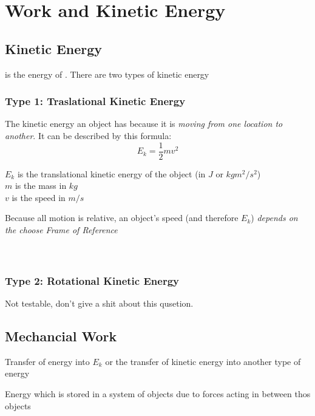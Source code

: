 \section{Work and Kinetic Energy}
\subsection{Kinetic Energy}
\begin{cyanblock}
    \begin{definition}
         is the energy of . There are two types of kinetic energy
    \end{definition}
\end{cyanblock}

\subsubsection*{Type 1: Traslational Kinetic Energy}
The kinetic energy an object has because it is \textit{moving from one location to another}. It can be described by this 
formula:
\begin{equation}
    E_k = \frac{1}{2}mv^2
\end{equation}
\begin{center}
    $E_k$ is the translational kinetic energy of the object (in $J$ or $kgm^2/s^2$)\\
    $m$ is the mass in $kg$\\
    $v$ is the speed in $m/s$
\end{center}

Because all motion is relative, an object's speed (and therefore $E_k$) \textit{depends on the choose Frame of Reference}\\

\\

\\


\subsubsection*{Type 2: Rotational Kinetic Energy}
    Not testable, don't give a shit about this qusetion. 

\subsection{Mechancial Work}
\begin{cyanblock}
    \begin{definition}
    Transfer of energy into $E_k$ or the transfer of kinetic energy into another type of energy
\end{definition}

\begin{definition}
   Energy which is stored in a system of objects due to forces acting in between thos objects
\end{definition}
\end{cyanblock}


